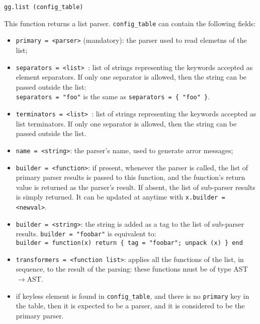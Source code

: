 \begin{verbatim}
gg.list (config_table)
\end{verbatim}

This function returns a list parser. \verb|config_table| can contain
the following fields:
\begin{itemize}

\item\verb|primary = <parser>| (mandatory): the parser used to read
  elemetns of the list;

\item\verb|separators = <list> |: list of strings representing the
  keywords accepted as element separators. If only one separator is
  allowed, then the string can be passed outside the list:\\
  \verb|separators = "foo"| is the same as 
  \verb|separators = { "foo" }|.

\item\verb|terminators = <list> |: list of strings representing the
  keywords accepted as list terminators. If only one separator is
  allowed, then the string can be passed outside the list.

\item\verb|name = <string>|: the parser's name, used to generate arror
  messages;

\item\verb|builder = <function>|: if present, whenever the parser is
  called, the list of primary parser results is passed to this
  function, and the function's return value is returned as the
  parser's result. If absent, the list of sub-parser results is simply
  returned. It can be updated at anytime with
  \verb|x.builder = <newval>|.

\item\verb|builder = <string>|: the string is added as a tag to the
  list of sub-parser results. \verb|builder = "foobar"| is equivalent
  to:\\
 \verb|builder = function(x) return { tag = "foobar"; unpack (x) } end|

\item\verb|transformers = <function list>|: applies all the functions
  of the list, in sequence, to the result of the parsing: these
  functions must be of type AST$\rightarrow$AST.

\item if keyless element is found in \verb|config_table|, and there is
  no \verb|primary| key in the table, then it is expected to be a
  parser, and it is considered to be the primary parser.
\end{itemize}

